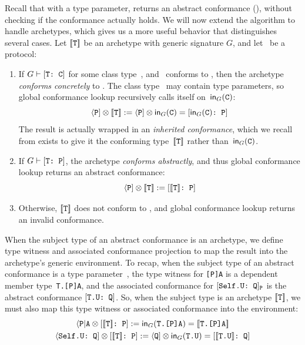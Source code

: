 \documentclass[../generics]{subfiles}
\begin{document}
Recall that with a type parameter,  returns an abstract conformance (), without checking if the conformance actually holds. We will now extend the algorithm to handle archetypes, which gives us a more useful behavior that distinguishes several cases. Let $[\![\texttt{T}]\!]$ be an archetype with generic signature $G$, and let \tP\ be a protocol:
\begin{enumerate}
\item If $G\vdash[\texttt{T:~C}]$ for some class type~\tC, and \tC\ conforms to \tP, then the archetype \emph{conforms concretely} to \tP. The class type \tC\ may contain type parameters, so global conformance lookup recursively calls itself on~$\mathsf{in}_G(\texttt{C})$:
\[\langle\texttt{P}] \otimes [\![\texttt{T}]\!] := \langle\texttt{P}] \otimes \mathsf{in}_G(\texttt{C})=[\texttt{$\mathsf{in}_G(\texttt{C})$:~P}]\]
The result is actually wrapped in an \emph{inherited conformance}, which we recall from  exists to give it the conforming type~$[\![\texttt{T}]\!]$ rather than~$\mathsf{in}_G(\texttt{C})$.
\item If $G\vdash[\texttt{T:~P}]$, the archetype \emph{conforms abstractly}, and thus global conformance lookup returns an abstract conformance:
\[\langle\texttt{P}]\otimes[\![\texttt{T}]\!] := [\texttt{$[\![\texttt{T}]\!]$:~P}]\]
\item Otherwise, $[\![\texttt{T}]\!]$ does not conform to \tP, and global conformance lookup returns an invalid conformance.
\end{enumerate}
When the subject type of an abstract conformance is an archetype, we define type witness and associated conformance projection to map the result into the archetype's generic environment. To recap, when the subject type of an abstract conformance is a type parameter~\tT, the type witness for \texttt{[P]A} is a dependent member type~\texttt{T.[P]A}, and the associated conformance for $[\texttt{Self.U:~Q}]_{\texttt{P}}$ is the abstract conformance $[\texttt{T.U:~Q}]$. So, when the subject type is an archetype $[\![\texttt{T}]\!]$, we must also map this type witness or associated conformance into the environment:
\begin{gather*}
\AssocType{P}{A}\otimes \ConfReq{$\archetype{T}$}{P} := \MapIn(\texttt{T.[P]A}) =\archetype{T.[P]A}\\
\AssocConf{Self.U}{Q}\otimes \ConfReq{$\archetype{T}$}{P} := \PQ\otimes\MapIn(\texttt{T.U})=\ConfReq{$\archetype{T.U}$}{Q}
\end{gather*}
\end{document}

